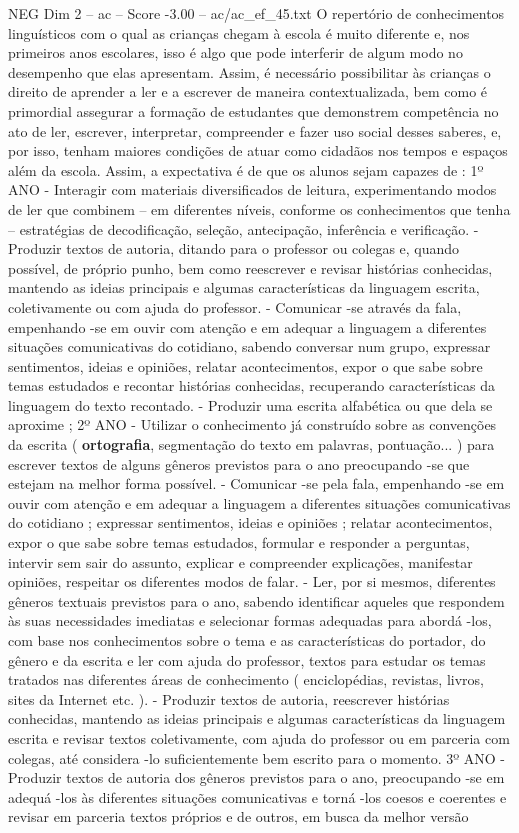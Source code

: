 \begin{textsample}{NEG Dim 2 – ac – Score -3.00 – ac/ac\_ef\_45.txt}
O repertório de conhecimentos linguísticos com o qual as crianças chegam à escola é muito diferente e, nos primeiros anos escolares, isso é algo que pode interferir de algum modo no desempenho que elas apresentam.
Assim, é necessário possibilitar às crianças o direito de aprender a ler e a escrever de maneira contextualizada, bem como é primordial assegurar a formação de estudantes que demonstrem competência no ato de ler, escrever, interpretar, compreender e fazer uso social desses saberes, e, por isso, tenham maiores condições de atuar como cidadãos nos tempos e espaços além da escola.
Assim, a expectativa é de que os alunos sejam capazes de : 1º ANO - Interagir com materiais diversificados de leitura, experimentando modos de ler que combinem – em diferentes níveis, conforme os conhecimentos que tenha – estratégias de decodificação, seleção, antecipação, inferência e verificação. - Produzir textos de autoria, ditando para o professor ou colegas e, quando possível, de próprio punho, bem como reescrever e revisar histórias conhecidas, mantendo as ideias principais e algumas características da linguagem escrita, coletivamente ou com ajuda do professor. - Comunicar -se através da fala, empenhando -se em ouvir com atenção e em adequar a linguagem a diferentes situações comunicativas do cotidiano, sabendo conversar num grupo, expressar sentimentos, ideias e opiniões, relatar acontecimentos, expor o que sabe sobre temas estudados e recontar histórias conhecidas, recuperando características da linguagem do texto recontado. - Produzir uma escrita alfabética ou que dela se aproxime ; 2º ANO - Utilizar o conhecimento já construído sobre as convenções da escrita ( \textbf{ortografia}, segmentação do texto em palavras, pontuação... ) para escrever textos de alguns gêneros previstos para o ano preocupando -se que estejam na melhor forma possível. - Comunicar -se pela fala, empenhando -se em ouvir com atenção e em adequar a linguagem a diferentes situações comunicativas do cotidiano ; expressar sentimentos, ideias e opiniões ; relatar acontecimentos, expor o que sabe sobre temas estudados, formular e responder a perguntas, intervir sem sair do assunto, explicar e compreender explicações, manifestar opiniões, respeitar os diferentes modos de falar. - Ler, por si mesmos, diferentes gêneros textuais previstos para o ano, sabendo identificar aqueles que respondem às suas necessidades imediatas e selecionar formas adequadas para abordá -los, com base nos conhecimentos sobre o tema e as características do portador, do gênero e da escrita e ler com ajuda do professor, textos para estudar os temas tratados nas diferentes áreas de conhecimento ( enciclopédias, revistas, livros, sites da Internet etc. ). - Produzir textos de autoria, reescrever histórias conhecidas, mantendo as ideias principais e algumas características da linguagem escrita e revisar textos coletivamente, com ajuda do professor ou em parceria com colegas, até considera -lo suficientemente bem escrito para o momento. 3º ANO - Produzir textos de autoria dos gêneros previstos para o ano, preocupando -se em adequá -los às diferentes situações comunicativas e torná -los coesos e coerentes e revisar em parceria textos próprios e de outros, em busca da melhor versão 
\end{textsample}
